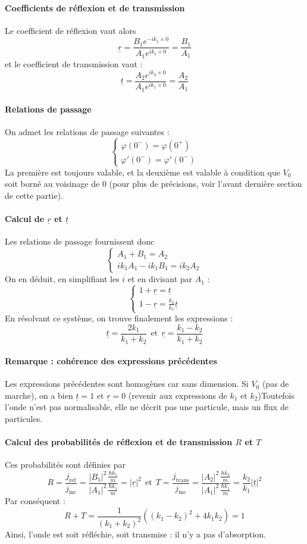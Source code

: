 \documentclass[french]{book}
\theoremstyle{plain}
\theoremstyle{definition}
\theoremstyle{remark}
\begin{document}
\paragraph{Coefficients de réflexion et de transmission}Le coefficient de réflexion vaut alors $$\underline{r}=\frac{B_1e^{-ik_1\times 0}}{A_1e^{ik_1\times 0}}=\frac{B_1}{A_1}$$ et le coefficient de transmission vaut : $$\underline{t}=\frac{A_2e^{ik_2\times 0}}{A_1e^{ik_1\times 0}}=\frac{A_2}{A_1}$$
\paragraph{Relations de passage} On admet les relations de passage suivantes : $$\begin{cases}
	\varphi(0^-)=\varphi(0^+)\\
	\varphi'(0^-)=\varphi'(0^-)
\end{cases}$$ La première est toujours valable, et la deuxième est valable à condition que $V_0$ soit borné au voisinage de $0$ (pour plus de précisions, voir l'avant dernière section de cette partie).
\paragraph{Calcul de $\underline{r}$ et $\underline{t}$} Les relations de passage fournissent donc $$\begin{cases}
	A_1+B_1=A_2 \\
	ik_1A_1-ik_1B_1=ik_2A_2
\end{cases}$$ On en déduit, en simplifiant les $i$ et en divisant par $A_1$ : $$\begin{cases}
1+\underline{r}=\underline{t} \\
1-\underline{r}=\displaystyle\frac{k_2}{k_1}\underline{t}
\end{cases}$$ En résolvant ce système, on trouve finalement les expressions : $$\underline{t}=\frac{2k_1}{k_1+k_2} \ \ \text{et} \ \ \underline{r}=\frac{k_1-k_2}{k_1+k_2}$$
\paragraph{Remarque : cohérence des expressions précédentes} Les expressions précédentes sont homogènes car sans dimension. Si $V_0$ (pas de marche), on a bien $\underline{t}=1$ et $\underline{r}=0$ (revenir aux expressions de $k_1$ et $k_2$)Toutefois l’onde n’est pas normalisable, elle ne décrit pas une particule, mais un flux de particules.
\paragraph{Calcul des probabilités de réflexion et de transmission $R$ et $T$}
Ces probabilités sont définies par $$R=\frac{j_\text{ref}}{j_\text{inc}}=\frac{\lvert B_1\rvert^2}{\lvert A_1\rvert^2}\frac{\frac{\hbar k_1}{m}}{\frac{\hbar k_1}{m}}=\lvert\underline{r}\rvert^2 \ \ \text{et} \ \ T=\frac{j_\text{trans}}{j_\text{inc}}=\frac{\lvert A_2\rvert^2}{\lvert A_1\rvert^2}\frac{\frac{\hbar k_2}{m}}{\frac{\hbar k_1}{m}}=\frac{k_2}{k_1}\lvert\underline{t}\rvert^2$$
Par conséquent : $$R+T=\frac{1}{(k_1+k_2)^2}\left((k_1-k_2)^2+4k_1k_2\right)=1$$ Ainsi, l'onde est soit réfléchie, soit transmise : il n'y a pas d'absorption.
\end{document}
